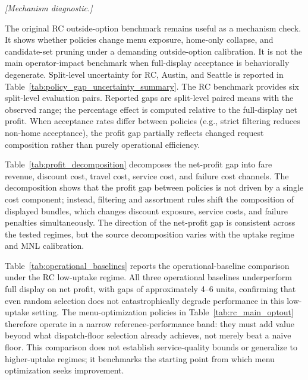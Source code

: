 \textit{[Mechanism diagnostic.]}


The original RC outside-option benchmark remains useful as a mechanism check. It shows whether policies change menu exposure, home-only collapse, and candidate-set pruning under a demanding outside-option calibration. It is not the main operator-impact benchmark when full-display acceptance is behaviorally degenerate. Split-level uncertainty for RC, Austin, and Seattle is reported in Table~\ref{tab:policy_gap_uncertainty_summary}. The RC benchmark provides six split-level evaluation pairs. Reported gaps are split-level paired means with the observed range; the percentage effect is computed relative to the full-display net profit. When acceptance rates differ between policies (e.g., strict filtering reduces non-home acceptance), the profit gap partially reflects changed request composition rather than purely operational efficiency.

Table~\ref{tab:profit_decomposition} decomposes the net-profit gap into fare revenue, discount cost, travel cost, service cost, and failure cost channels. The decomposition shows that the profit gap between policies is not driven by a single cost component; instead, filtering and assortment rules shift the composition of displayed bundles, which changes discount exposure, service costs, and failure penalties simultaneously. The direction of the net-profit gap is consistent across the tested regimes, but the source decomposition varies with the uptake regime and MNL calibration.


Table~\ref{tab:operational_baselines} reports the operational-baseline comparison under the RC low-uptake regime. All three operational baselines underperform full display on net profit, with gaps of approximately 4--6 units, confirming that even random selection does not catastrophically degrade performance in this low-uptake setting. The menu-optimization policies in Table~\ref{tab:rc_main_optout} therefore operate in a narrow reference-performance band: they must add value beyond what dispatch-floor selection already achieves, not merely beat a naive floor. This comparison does not establish service-quality bounds or generalize to higher-uptake regimes; it benchmarks the starting point from which menu optimization seeks improvement.

